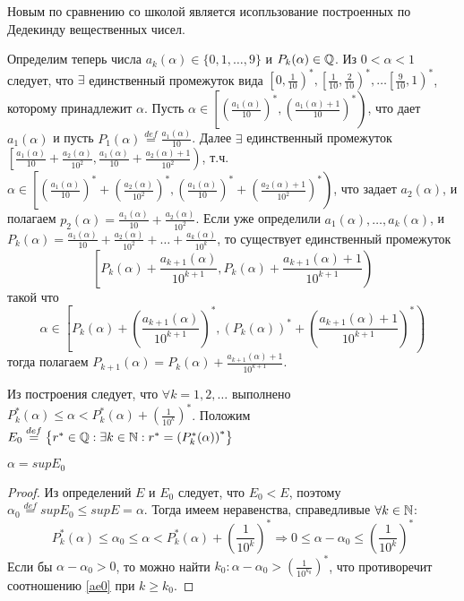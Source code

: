 \documentclass[main]{subfiles}
\begin{document}
Новым по сравнению со школой является исопльзование построенных по Дедекинду
вещественных чисел.

Определим теперь числа $a_k(\alpha) \in \{0, 1, \ldots, 9\}$ и $P_k(\alpha) 
\in \mathbb{Q}$. Из $0 < \alpha < 1$ следует, что $\exists$ единственный промежуток
вида $\left[0, \frac{1}{10}\right)^*, \left[\frac{1}{10}, \frac{2}{10}\right)^*,
\ldots \left[\frac{9}{10}, 1\right)^*$, которому принадлежит $\alpha$. 
Пусть $\alpha \in \left[ \left(\frac{a_1(\alpha)}{10}\right)^*, 
\left(\frac{a_1(\alpha) + 1}{10}\right)^* \right)$, что дает $a_1(\alpha)$ и
пусть $P_1(\alpha) \overset{def}{=} \frac{a_1(\alpha)}{10}$. Далее $\exists$
единственный промежуток $\left[ \frac{a_1(\alpha)}{10} + 
\frac{a_2(\alpha)}{10^2}, \frac{a_1(\alpha)}{10} + \frac{a_2(\alpha) + 1}{10^2}
\right)$, т.ч. $\alpha \in \left[ \left(\frac{a_1(\alpha)}{10}\right)^* + 
\left(\frac{a_2(\alpha)}{10^2}\right)^*, \left(\frac{a_1(\alpha)}{10}\right)^* + 
\left(\frac{a_2(\alpha) + 1}{10^2}\right)^*
\right)$, что задает $a_2(\alpha)$, и полагаем $p_2(\alpha) = 
\frac{a_1(\alpha)}{10} + \frac{a_2(\alpha)}{10^2}$. Если уже определили 
$a_1(\alpha), \ldots, a_k(\alpha)$, и 
$P_k(\alpha) = \frac{a_1(\alpha)}{10} + \frac{a_2(\alpha)}{10^2} + \ldots +
\frac{a_k(\alpha)}{10^k}$, то существует единственный промежуток
\begin{equation*}
    \left[ 
        P_k(\alpha) + \frac{a_{k+1}(\alpha)}{10^{k+1}},
        P_k(\alpha) + \frac{a_{k+1}(\alpha) + 1}{10^{k+1}}
    \right)
\end{equation*}
такой что 
\begin{equation*}
    \alpha \in 
    \left[ 
        P_k(\alpha) + \left(\frac{a_{k+1}(\alpha)}{10^{k+1}}\right)^*,
        \left(P_k(\alpha)\right)^* 
        + \left(\frac{a_{k+1}(\alpha) + 1}{10^{k+1}}\right)^*
    \right)
\end{equation*}
тогда полагаем $P_{k + 1}(\alpha) = P_{k}(\alpha) + 
\frac{a_{k+1}(\alpha) + 1}{10^{k+1}}$.

Из построения следует, что $\forall k = 1,2, \ldots$ выполнено 
$P_k^*(\alpha) \leq \alpha < P_k^*(\alpha) + \left(\frac{1}{10^k}\right)^*$.
Положим $E_0 \overset{def}{=} \left\{r^* \in \mathbb{Q} : \exists
k \in \mathbb{N} : r^* = \left(P_k^*(\alpha)\right)^* \right\}$

\begin{assertion}
    $\alpha = supE_0$
\end{assertion}
\begin{proof}
    Из определений $E$ и $E_0$ следует, что $E_0 < E$, поэтому 
    $\alpha_0 \overset{def}{=} supE_0 \leq supE = \alpha$. Тогда имеем 
    неравенства, справедливые $\forall k \in \mathbb{N}$:
    \begin{equation}\label{ae0}
        P_k^*(\alpha) \leq \alpha_0 \leq \alpha < P_k^*(\alpha) + 
        \left(\frac{1}{10^k}\right)^* \Rightarrow 
        0 \leq \alpha - \alpha_0 \leq \left(\frac{1}{10^k}\right)^*
    \end{equation}
    Если бы $\alpha - \alpha_0 > 0$, то можно найти $k_0 : \alpha - \alpha_0 >
    \left(\frac{1}{10^{k_0}}\right)^*$, что противоречит соотношению \ref{ae0} 
    при $k \geq k_0$.
\end{proof}
\end{document}

